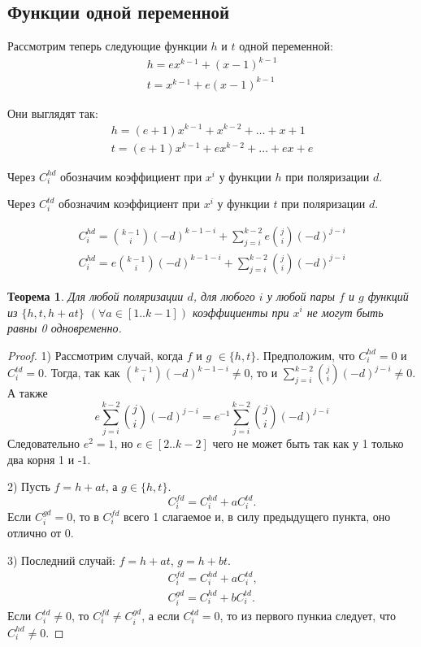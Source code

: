 \documentclass[bibliography=totoc, a4paper, 12pt]{extarticle}
\newtheorem{myth}{Теорема}
\begin{document}
\subsection{Функции одной переменной}
Рассмотрим теперь следующие функции $h$ и $t$ одной переменной:
\[
    \begin{array}{l}
        h = ex^{k-1} + (x-1)^{k-1} \\
        t = x^{k-1} + e(x-1)^{k-1}
    \end{array}
\]

Они выглядят так:
\[
    \begin{array}{l}
        h = (e+1)x^{k-1} + x^{k-2} + \dots + x + 1\\
        t = (e+1)x^{k-1} + ex^{k-2} + \dots + ex + e
    \end{array}
\]

Через $C_i^{hd}$ обозначим коэффициент при $x^i$ у функции $h$ при поляризации
$d$.

Через $C_i^{td}$ обозначим коэффициент при $x^i$ у функции $t$ при поляризации
$d$.

\[
    \begin{array}{l}
        C_i^{hd} = \binom{k-1}{i} (-d)^{k-1-i} +
            \sum\limits_{j=i}^{k-2} e \binom{j}{i} (-d)^{j-i} \\
        C_i^{hd} = e \binom{k-1}{i} (-d)^{k-1-i} +
            \sum\limits_{j=i}^{k-2} \binom{j}{i} (-d)^{j-i}
    \end{array}
\]

\begin{myth}
    Для любой поляризации $d$, для любого $i$ у любой пары $f$ и $g$ функций из
    $\{h, t, h + at\}$ $(\forall a \in [1..k-1])$ коэффициенты при $x^i$ не
    могут быть равны 0 одновременно.
\end{myth}
\begin{proof}

    1) Рассмотрим случай, когда $f$ и $g$ $\in \{h, t\}$.
    Предположим, что $C_i^{hd} = 0$ и $C_i^{td} = 0$. Тогда, так как
    $\binom{k-1}{i} (-d)^{k-1-i} \neq 0$, то и $\sum\limits_{j=i}^{k-2}
    \binom{j}{i} (-d)^{j-i} \neq 0$. А также
    \[
        e \sum\limits_{j=i}^{k-2} \binom{j}{i} (-d)^{j-i} =
        e^{-1} \sum\limits_{j=i}^{k-2} \binom{j}{i} (-d)^{j-i}
    \]
    Следовательно $e^2 = 1$, но $e \in [2..k-2]$ чего не может быть так как
    у 1 только два корня 1 и -1.

    2) Пусть $f = h + at$, а $g \in \{h, t\}$.
    \[
        C_i^{fd} = C_i^{hd} + aC_i^{td} \text{.}
    \]
    Если $C_i^{gd} = 0$, то в $C_i^{fd}$ всего 1 слагаемое и, в силу
    предыдущего пункта, оно отлично от 0.

    3) Последний случай: $f = h + at$, $g = h + bt$.
    \[
        \begin{array}{l}
            C_i^{fd} = C_i^{hd} + aC_i^{td} \text{,} \\
            C_i^{gd} = C_i^{hd} + bC_i^{td} \text{.}
        \end{array}
    \]
    Если $C_i^{td} \neq 0$, то $C_i^{fd} \neq C_i^{gd}$, а если $C_i^{td} = 0$,
    то из первого пункиа следует, что $C_i^{hd} \neq 0$.

\end{proof}
\end{document}
